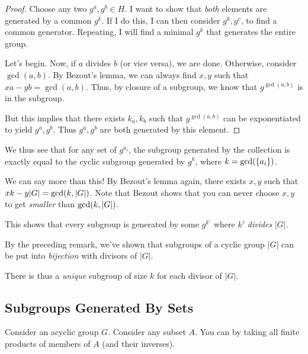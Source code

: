\documentclass[11pt, oneside]{amsart}
\begin{document}
\begin{proof}
  Choose any two $g^a, g^b \in H$. I want to show that \emph{both}
  elements are generated by a common $g^k$. If I do this, I can then
  consider $g^k, g^c$, to find a common generator. Repeating, I will
  find a minimal $g^k$ that generates the entire group.

  Let's begin. Now, if $a$ divides $b$ (or vice versa), we are done.
  Otherwise, consider $\gcd(a, b)$. By Bezout's lemma, we can always
  find $x, y$ such that $xa - yb = \gcd(a, b)$. Thus, by closure of a
  subgroup, we know that $g^{\gcd(a, b)}$ is in the subgroup.

  But this implies that there exists $k_a, k_b$ such that $g^{\gcd(a,
  b)}$ can be exponentiated to yield $g^a, g^b$. Thus $g^a, g^b$ are
  both generated by this element.
\end{proof}

\begin{remark}
  We thus see that for any set of $g^{a_i}$, the subgroup generated by
  the collection is exactly equal to the cyclic subgroup generated by
  $g^k$, where $k = \gcd\mathopen{}\left( {\left\{ a_i \right\}} \right)\mathclose{}$.
\end{remark}

\begin{remark}
  We can say more than this! By Bezout's lemma again, there exists $x,
  y$ such that $xk - y|G| = \gcd\mathopen{}\left( {k, |G|} \right)\mathclose{}$. Note that Bezout shows
  that you can never choose $x, y$ to get \emph{smaller} than
  $\gcd\mathopen{}\left( {k, |G|} \right)\mathclose{}$.

  This shows that every subgroup is generated by some $g^{k'}$ where
  $k'$ \emph{divides} $|G|$.
\end{remark}

\begin{theorem}
  By the preceding remark, we've shown that subgroups of a cyclic group
  $|G|$ can be put into \emph{bijection} with divisors of $|G|$.

  There is thus a \emph{unique} subgroup of size $k$ for each divisor of
  $|G|$.
\end{theorem}

\subsection{Subgroups Generated By Sets}

\begin{definition}
  Consider an acyclic group $G$. Consider any subset $A$. You can
   by taking all finite products of
  members of $A$ (and their inverses).
\end{definition}
\end{document}
